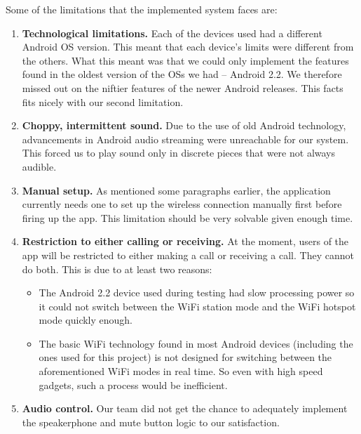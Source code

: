 \documentclass[12pt,svgnames,smaller]{article} %
\begin{document}
	Some of the limitations that the implemented system faces are:
	
	\begin{enumerate}
		\item \textbf{Technological limitations.} Each of the devices used had a different Android OS version. This meant that each device's limits were different from the others. What this meant was that we could only implement the features found in the oldest version of the OSs we had – Android 2.2. We therefore missed out on the niftier features of the newer Android releases. This facts fits nicely with our second limitation.
		\item \textbf{Choppy, intermittent sound.} Due to the use of old Android technology, advancements in Android audio streaming were unreachable for our system. This forced us to play sound only in discrete pieces that were not always audible.
		\item \textbf{Manual setup.} As mentioned some paragraphs earlier, the application currently needs one to set up the wireless connection manually first before firing up the app. This limitation should be very solvable given enough time.
		\item \textbf{Restriction to either calling or receiving.} At the moment, users of the app will be restricted to either making a call or receiving a call. They cannot do both. This is due to at least two reasons:
		\begin{itemize}
			\item The Android 2.2 device used during testing had slow processing power so it could not switch between the WiFi station mode and the WiFi hotspot mode quickly enough.
			\item The basic WiFi technology found in most Android devices (including the ones used for this project) is not designed for switching between the aforementioned WiFi modes in real time. So even with high speed gadgets, such a process would be inefficient. 
		\end{itemize}
		\item \textbf{Audio control.} Our team did not get the chance to adequately implement the speakerphone and mute button logic to our satisfaction. 
	\end{enumerate}

	
\end{document}
